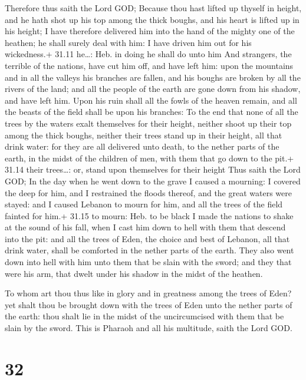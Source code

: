  Therefore thus saith the Lord GOD; Because thou hast
lifted up thyself in height, and he hath shot up his top among the thick
boughs, and his heart is lifted up in his height;  I have
therefore delivered him into the hand of the mighty one of the heathen;
he shall surely deal with him: I have driven him out for his
wickedness.+ 31.11 he\ldots: Heb. in doing he shall do unto him
 And strangers, the terrible of the nations, have cut him
off, and have left him: upon the mountains and in all the valleys his
branches are fallen, and his boughs are broken by all the rivers of the
land; and all the people of the earth are gone down from his shadow, and
have left him.  Upon his ruin shall all the fowls of the
heaven remain, and all the beasts of the field shall be upon his
branches:  To the end that none of all the trees by the
waters exalt themselves for their height, neither shoot up their top
among the thick boughs, neither their trees stand up in their height,
all that drink water: for they are all delivered unto death, to the
nether parts of the earth, in the midst of the children of men, with
them that go down to the pit.+ 31.14 their trees\ldots: or, stand upon
themselves for their height  Thus saith the Lord GOD; In
the day when he went down to the grave I caused a mourning: I covered
the deep for him, and I restrained the floods thereof, and the great
waters were stayed: and I caused Lebanon to mourn for him, and all the
trees of the field fainted for him.+ 31.15 to mourn: Heb. to be black
 I made the nations to shake at the sound of his fall, when
I cast him down to hell with them that descend into the pit: and all the
trees of Eden, the choice and best of Lebanon, all that drink water,
shall be comforted in the nether parts of the earth.  They
also went down into hell with him unto them that be slain with the
sword; and they that were his arm, that dwelt under his shadow in the
midst of the heathen.

 To whom art thou thus like in glory and in greatness
among the trees of Eden? yet shalt thou be brought down with the trees
of Eden unto the nether parts of the earth: thou shalt lie in the midst
of the uncircumcised with them that be slain by the sword. This is
Pharaoh and all his multitude, saith the Lord GOD.

\hypertarget{section-31}{%
\section{32}\label{section-31}}

